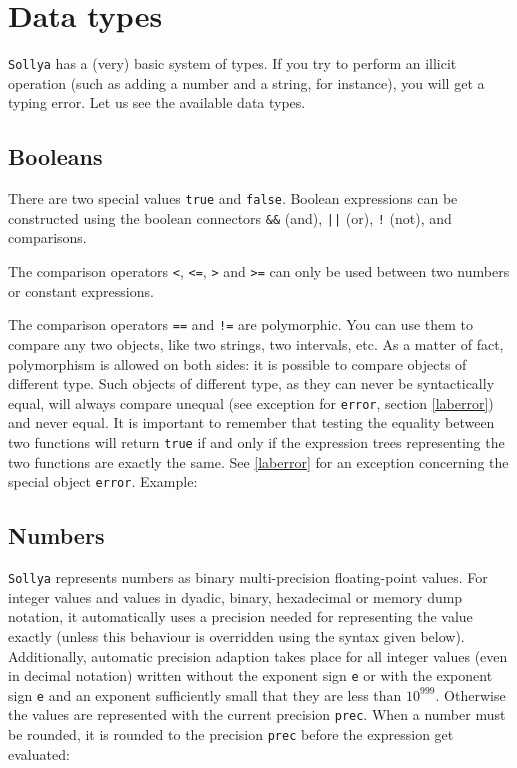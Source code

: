 \documentclass[a4paper]{article}
\newcommand{\com}[1]{\texttt{#1}}
\newcommand{\key}[1]{\texttt{#1}}
\newcommand{\sollya}{\texttt{Sollya}\xspace}
\begin{document}
\section{Data types}\label{sec:data_types}
\sollya has a (very) basic system of types. If you try to perform an illicit operation (such as adding a number and a string, for instance), you will get a typing error. Let us see the available data types.

\subsection{Booleans}
There are two special values \key{true} and \key{false}. Boolean expressions can be constructed using the boolean connectors \key{\&\&} (and), \key{||} (or), \key{!} (not), and comparisons.

The comparison operators \key{<}, \key{<=}, \key{>} and \key{>=} can only be used between two numbers or constant expressions.

The comparison operators \key{==} and \key{!=} are polymorphic. You can use them to compare any two objects, like two strings, two intervals, etc. As a matter of fact, polymorphism is allowed on both sides: it is possible to compare objects of different type. Such objects of different type, as they can never be syntactically equal, will always compare unequal (see exception for \key{error}, section \ref{laberror}) and never equal. It is important to remember that testing the equality between two functions will return \key{true} if and only if the expression trees representing the two functions are exactly the same. See \ref{laberror} for an exception concerning the special object \key{error}. Example:



\subsection{Numbers} \label{sec:numbers}
\sollya represents numbers as binary multi-precision floating-point values. For integer values and values in dyadic, binary, hexadecimal or memory dump notation, it 
automatically uses a precision needed for representing the value exactly (unless this behaviour is overridden using the syntax given below). Additionally, automatic precision adaption takes place for all 
integer values (even in decimal notation) written without the exponent sign \texttt{e} or with the exponent sign \texttt{e} and an exponent sufficiently 
small that they are less than $10^{999}$. Otherwise the values are represented with the current precision \com{prec}. When a number must be rounded, it is rounded to the precision \com{prec} before the expression get evaluated:
\end{document}
